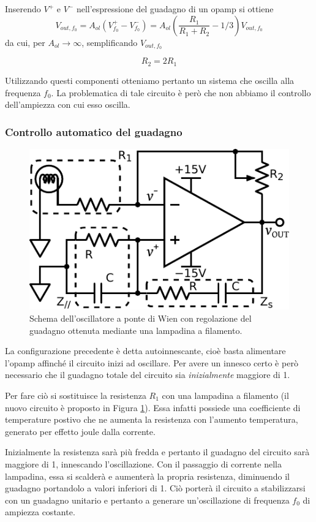 Inserendo $V^+$ e $V^-$ nell'espressione del guadagno di un opamp si ottiene
\vspace{-2mm}
\begin{equation}
	V_{out,f_0} = A_{ol}\left( V^+_{f_0} - V^-_{f_0} \right) = A_{ol}\left(\frac{R_1}{R_1+R_2} - 1/3\right)V_{out,f_0}
\end{equation}
\vspace{-4mm}
da cui, per $A_{ol} \rightarrow \infty$, semplificando $V_{out,f_0}$

\begin{equation}
	R_2 = 2 R_1
\end{equation}

Utilizzando questi componenti otteniamo pertanto un sistema che oscilla alla frequenza $f_0$.
La problematica di tale circuito è però che non abbiamo il controllo dell'ampiezza con cui esso oscilla.

\subsubsection*{Controllo automatico del guadagno}

\begin{figure}
\centering
\includegraphics[width=.35\textwidth]{../E08/latex/osc_w_lamp.pdf}
\caption{Schema dell'oscillatore a ponte di Wien con regolazione del guadagno ottenuta mediante una lampadina a filamento.}
\label{cir8:with_lamp}
\end{figure}

La configurazione precedente è detta autoinnescante, cioè basta alimentare l'opamp affinché il circuito inizi ad oscillare.
Per avere un innesco certo è però necessario che il guadagno totale del circuito sia \textit{inizialmente} maggiore di \num{1}.

Per fare ciò si sostituisce la resistenza $R_1$ con una lampadina a filamento (il nuovo circuito è proposto in Figura \ref{cir8:with_lamp}).
Essa infatti possiede una coefficiente di temperature postivo che ne aumenta la resistenza con l'aumento temperatura, generato per effetto joule dalla corrente.

Inizialmente la resistenza sarà più fredda e pertanto il guadagno del circuito sarà maggiore di \num{1}, innescando l'oscillazione.
Con il passaggio di corrente nella lampadina, essa si scalderà e aumenterà la propria resistenza, diminuendo il guadagno portandolo a valori inferiori di \num{1}.
Ciò porterà il circuito a stabilizzarsi con un guadagno unitario e pertanto a generare un'oscillazione di frequenza $f_0$ di ampiezza costante.

